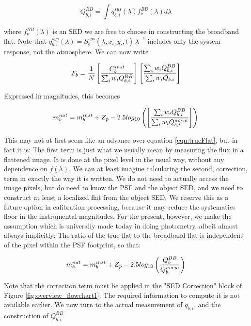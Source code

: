 \documentclass[12pt,preprint]{aastex}
\begin{document}
\begin{equation}
Q_{b,i}^{BB} = \int {q_{b,i}^{sys}(\lambda) f_\nu^{BB}(\lambda) d\lambda}
\end{equation}

where $f_\nu^{BB}(\lambda)$ is an SED we are free to choose in constructing the broadband flat. Note that 
$q_{b,i}^{sys}(\lambda)=S_b^{sys}(\lambda,x_i,y_i,t) \, \lambda^{-1}$ 
includes only the system response, not the atmosphere.  We can now write

\begin{equation}
F_b = {1 \over N} \left[ {C_b^{inst} \over {\sum_i{w_i Q_{b,i}^{BB}}}}\right]  \left[ {\sum_i {w_i Q_{b,i}^{BB} }} \over {\sum_i {w_i Q_{b,i} }}\right]
\end{equation}

Expressed in magnitudes, this becomes

\begin{equation}
m_b^{nat} = m_b^{inst} + Z_p - 2.5 log_{10} \left( \left[ {\sum_i {w_i Q_{b,i}^{BB} }} \over {\sum_i {w_i Q_{b,i}^{norm} }}\right] \right)
\end{equation}


This may not at first seem like an advance over equation \ref{eqn:trueFlat}, but in fact it is:  The first term is just what we usually
mean by measuring the flux in a flattened image.  It is done at the pixel level in the usual way, without any dependence on 
$f(\lambda)$.  We can at least imagine calculating the second, correction, term in exactly the way it is written.  We do
not need to actually access the image pixels, but do need to know the PSF and the object SED, and we need to construct at least
a localized flat from the object SED.  We reserve this as a future option in calibration processing, because it may reduce
the systematics floor in the instrumental magnitudes.  For the present, however, we make the assumption which is univerally made
today in doing photometry, albeit almost always implicitly:  The ratio of the true flat to the broadband flat is independent 
of the pixel within the PSF footprint, so that:

\begin{equation}
m_b^{nat} =  m_b^{inst} + Z_p - 2.5 log_{10} \left( {Q_b^{BB}}  \over {Q_b^{norm}} \right) 
\label{eqn:flatCorrection}
\end{equation}

Note that the correction term must be applied in the "SED Correction" block of Figure \ref{fig:overview_flowchart1}.  The 
required information to compute it is not available earlier.  We now turn to the actual measurement of $q_{b,i}$, and the construction of $Q_{b,i}^{BB}$
\end{document}
